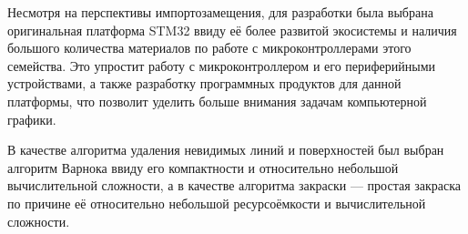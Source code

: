 Несмотря на перспективы импортозамещения, для разработки была выбрана оригинальная платформа STM32 ввиду её более развитой экосистемы и наличия большого количества материалов по работе с микроконтроллерами этого семейства. Это упростит работу с микроконтроллером и его периферийными устройствами, а также разработку программных продуктов для данной платформы, что позволит уделить больше внимания задачам компьютерной графики.

В качестве алгоритма удаления невидимых линий и поверхностей был выбран алгоритм Варнока ввиду его компактности и относительно небольшой вычислительной сложности, а в качестве алгоритма закраски --- простая закраска по причине её относительно небольшой ресурсоёмкости и вычислительной сложности.




